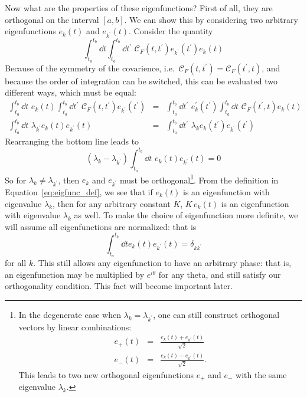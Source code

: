 Now what are the properties of these eigenfunctions?  First of all, they
are orthogonal on the interval $[a, b]$.
We can show this by considering two arbitrary eigenfunctions
$e_k(t)$ and $e_{k^\prime}(t)$.  Consider the quantity
\begin{equation}
  \int_{t_a}^{t_b} \dd t \int_{t_a}^{t_b} \dd t^\prime\,\, \mathcal{C}_F(t, t^\prime)
  e_{k^\prime}(t^\prime) e_k(t)
\end{equation}
Because of the symmetry of the covarience,
i.e.~$\mathcal{C}_F(t, t^\prime) = \mathcal{C}_F(t^\prime, t)$, and
because the order of integration can be switched, this can be evaluated
two different ways, which must be equal:
\begin{eqnarray}
  \int_{t_a}^{t_b} \dd t\,\, e_k(t)
  \int_{t_a}^{t_b} \dd t^\prime\,\, \mathcal{C}_F(t, t^\prime) e_{k^\prime}(t^\prime) &=&
  \int_{t_a}^{t_b} \dd t^\prime\,\, e_k^\prime(t^\prime)
  \int_{t_a}^{t_b} \dd t\,\, \mathcal{C}_F(t^\prime, t) e_{k}(t)
  \nonumber\\
  \int_{t_a}^{t_b} \dd t\,\, \lambda_{k^\prime} e_k(t) e_{k^\prime}(t) &=&
  \int_{t_a}^{t_b} \dd t^\prime\,\, \lambda_k e_k(t^\prime) e_{k^\prime}(t^\prime)
\end{eqnarray}
Rearranging the bottom line leads to
\begin{equation}
  (\lambda_k - \lambda_{k^\prime})
  \int_{t_a}^{t_b} \dd t\,\, e_k(t) e_{k^\prime}(t) = 0
\end{equation}
So for $\lambda_k \ne \lambda_{k^\prime}$, then $e_k$ and $e_{k^\prime}$
must be orthogonal\footnote{In the degenerate case when
$\lambda_k = \lambda_{k^\prime}$, one can still construct orthogonal
vectors by linear combinations:
\begin{eqnarray}
  e_+(t) &=& \frac{e_k(t) + e_{k^\prime}(t)}{\sqrt{2}} \nonumber\\
  e_-(t) &=& \frac{e_k(t) - e_{k^\prime}(t)}{\sqrt{2}}. \nonumber
\end{eqnarray}
This leads to two new orthogonal eigenfunctions $e_+$ and $e_-$ with the
same eigenvalue $\lambda_k$.}.  From the definition in
Equation~\ref{eq:eigfunc_def}, we see that if $e_k(t)$ is an eigenfunction
with eigenvalue $\lambda_k$,
then for any arbitrary constant $K$,
$K\, e_k(t)$ is an eigenfunction with eigenvalue $\lambda_k$ as well.
To make the choice of eigenfunction more definite, we will assume all
eigenfunctions are normalized: that is
\begin{equation}
  \int_{t_a}^{t_b} \dd t e_k(t) e_{k^\prime}(t) = \delta_{kk^\prime}
\end{equation}
for all $k$.  This still allows any eigenfunction to have an arbitrary
phase: that is, an eigenfunction may be multiplied by $e^{i\theta}$ for
any theta, and still satisfy our orthogonality condition.  This fact
will become important later.

